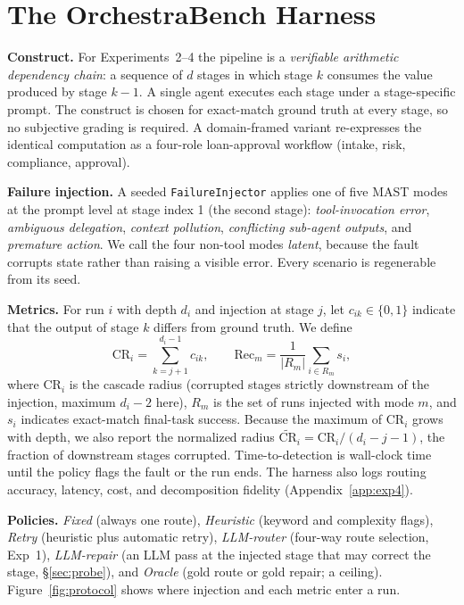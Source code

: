 \documentclass[11pt,a4paper]{article}
\begin{document}
\section{The OrchestraBench Harness}
\label{sec:bench}

\textbf{Construct.} For Experiments~2--4 the pipeline is a \emph{verifiable
arithmetic dependency chain}: a sequence of $d$ stages in which stage $k$
consumes the value produced by stage $k{-}1$. A single agent executes each stage
under a stage-specific prompt. The construct is chosen for exact-match ground
truth at every stage, so no subjective grading is required. A domain-framed
variant re-expresses the identical computation as a four-role loan-approval
workflow (intake, risk, compliance, approval).

\textbf{Failure injection.} A seeded \texttt{FailureInjector} applies one of five
MAST modes \citep{mast} at the prompt level at stage index 1 (the second stage):
\emph{tool-invocation error}, \emph{ambiguous delegation}, \emph{context
pollution}, \emph{conflicting sub-agent outputs}, and \emph{premature action}.
We call the four non-tool modes \emph{latent}, because the fault corrupts state
rather than raising a visible error. Every scenario is regenerable from its seed.

\textbf{Metrics.} For run $i$ with depth $d_i$ and injection at stage $j$, let
$c_{ik}\in\{0,1\}$ indicate that the output of stage $k$ differs from ground
truth. We define
\begin{equation}
  \mathrm{CR}_i=\sum_{k=j+1}^{d_i-1} c_{ik},
  \qquad
  \mathrm{Rec}_m=\frac{1}{|R_m|}\sum_{i\in R_m} s_i,
  \label{eq:metrics}
\end{equation}
where $\mathrm{CR}_i$ is the cascade radius (corrupted stages strictly
downstream of the injection, maximum $d_i{-}2$ here), $R_m$ is the set of runs
injected with mode $m$, and $s_i$ indicates exact-match final-task success.
Because the maximum of $\mathrm{CR}_i$ grows with depth, we also report the
normalized radius $\widetilde{\mathrm{CR}}_i=\mathrm{CR}_i/(d_i{-}j{-}1)$, the
fraction of downstream stages corrupted.
Time-to-detection is wall-clock time until the policy flags the fault or the
run ends. The harness also logs routing accuracy, latency, cost, and
decomposition fidelity (Appendix~\ref{app:exp4}).

\textbf{Policies.} \emph{Fixed} (always one route), \emph{Heuristic}
(keyword and complexity flags), \emph{Retry} (heuristic plus automatic retry),
\emph{LLM-router} (four-way route selection, Exp~1), \emph{LLM-repair} (an LLM
pass at the injected stage that may correct the stage, \S\ref{sec:probe}), and
\emph{Oracle} (gold route or gold repair; a ceiling). Figure~\ref{fig:protocol}
shows where injection and each metric enter a run.
\end{document}
